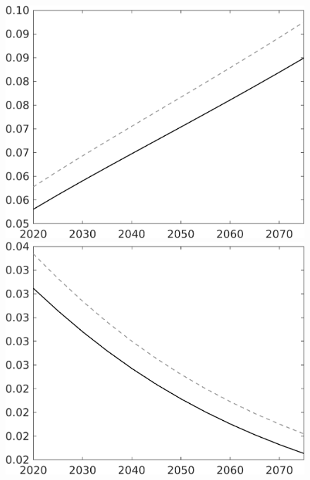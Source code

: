 \documentclass[12pt]{article}
\begin{document}
\begin{figure}
\begin{minipage}[]{0.32\textwidth}
	\includegraphics[width=1\textwidth]{../../codding_model/own_basedOnFried/optimalPol_010922_revision/figures/all_13Sept22/CompTaul_Equlab_LFBAU_Reg0_wsn_spillover0_nsk1_xgr0_knspil1_sep1_countec0_GovRev0_etaa0.79_lgd0.png}
\end{minipage}	
\begin{minipage}[]{0.32\textwidth}
	\includegraphics[width=1\textwidth]{../../codding_model/own_basedOnFried/optimalPol_010922_revision/figures/all_13Sept22/CompTaul_Equlab_LFBAU_Reg0_wsf_spillover0_nsk1_xgr0_knspil1_sep1_countec0_GovRev0_etaa0.79_lgd0.png}

\end{minipage}
\end{figure}
\end{document}
